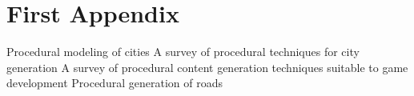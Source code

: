 \appendix
\chapter{First Appendix}

Procedural modeling of cities\cite{parish2001procedural}\newline
A survey of procedural techniques for city generation\cite{kelly2006survey}\newline
A survey of procedural content generation techniques suitable to game development\cite{de2011survey}\newline
Procedural generation of roads\cite{galin2010procedural}
